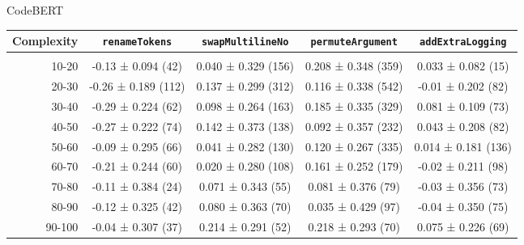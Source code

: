 \documentclass{article} %
\begin{document}
{\center

CodeBERT
  \begin{table}[H]
    \tiny
    \begin{tabular}{r|cccc}
      Complexity          & \lstinline|renameTokens|        & \lstinline|swapMultilineNo|     & \lstinline|permuteArgument|     & \lstinline|addExtraLogging|     \\\hline\\
      10-20               & -0.13 ± 0.094 (42)  & 0.040 ± 0.329 (156) & 0.208 ± 0.348 (359) & 0.033 ± 0.082 (15)  \\
      20-30               & -0.26 ± 0.189 (112) & 0.137 ± 0.299 (312) & 0.116 ± 0.338 (542) & -0.01 ± 0.202 (82)  \\
      30-40               & -0.29 ± 0.224 (62)  & 0.098 ± 0.264 (163) & 0.185 ± 0.335 (329) & 0.081 ± 0.109 (73)  \\
      40-50               & -0.27 ± 0.222 (74)  & 0.142 ± 0.373 (138) & 0.092 ± 0.357 (232) & 0.043 ± 0.208 (82)  \\
      50-60               & -0.09 ± 0.295 (66)  & 0.041 ± 0.282 (130) & 0.120 ± 0.267 (335) & 0.014 ± 0.181 (136) \\
      60-70               & -0.21 ± 0.244 (60)  & 0.020 ± 0.280 (108) & 0.161 ± 0.252 (179) & -0.02 ± 0.211 (98)  \\
      70-80               & -0.11 ± 0.384 (24)  & 0.071 ± 0.343 (55)  & 0.081 ± 0.376 (79)  & -0.03 ± 0.356 (73)  \\
      80-90               & -0.12 ± 0.325 (42)  & 0.080 ± 0.363 (70)  & 0.035 ± 0.429 (97)  & -0.04 ± 0.350 (75)  \\
      90-100              & -0.04 ± 0.307 (37)  & 0.214 ± 0.291 (52)  & 0.218 ± 0.293 (70)  & 0.075 ± 0.226 (69)  \\
    \end{tabular}
  \end{table}


}
\end{document}
